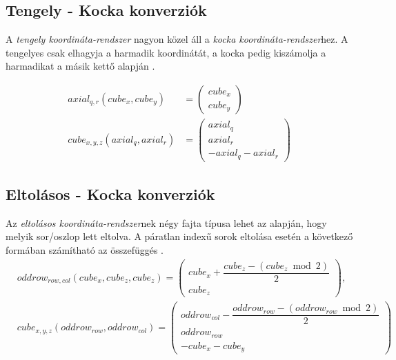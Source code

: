 \subsection{Tengely - Kocka konverziók}

A \textit{tengely koordináta-rendszer} nagyon közel áll a \textit{kocka koordináta-rendszer}hez. A tengelyes csak elhagyja a harmadik koordinátát, a kocka pedig kiszámolja a harmadikat a másik kettő alapján \cite{Conv_Axial}.


\begin{align*}
axial_{q, r}(cube_{x}, cube_{y}) &=
\left(
\begin{array}{c}
cube_{x} \\
cube_{y}
\end{array}
\right)
\\
cube_{x,y,z} (axial_{q}, axial_{r}) &=
\left(
\begin{array}{c}
axial_q \\
axial_r \\
-axial_q - axial_r
\end{array}
\right)
\end{align*}

\subsection{Eltolásos - Kocka konverziók}

Az \textit{eltolásos koordináta-rendszer}nek négy fajta típusa lehet az alapján, hogy melyik sor/oszlop lett eltolva. A páratlan indexű sorok eltolása esetén a következő formában számítható az összefüggés \cite{Conv_Offset}.
\begin{align*}
&oddrow_{row, col}(cube_{x},cube_{z}, cube_{z}) =
\left(
\begin{array}{c}
cube_{x} + \dfrac{cube_{z} - (cube_{z} \bmod 2)}{2} \\
cube_{z}
\end{array}
\right),
\\
&cube_{x, y, z}(oddrow_{row}, oddrow_{col}) =
\left(
\begin{array}{c}
oddrow_{col} - \dfrac{oddrow_{row} - (oddrow_{row} \bmod 2)}{2} \\
oddrow_{row} \\
-cube_{x} - cube_{y}
\end{array}
\right)
\end{align*}

